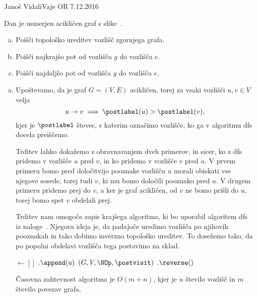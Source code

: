 \begin{naloga}{Janoš Vidali}{Vaje OR 7.12.2016}
\begin{vprasanje}
Dan je usmerjen acikličen graf s slike~\fig.

\begin{enumerate}[(a)]
\item Poišči topološko ureditev vozlišč zgornjega grafa.

\item Poišči najkrajšo pot od vozlišča $g$ do vozlišča $e$.

\item Poišči najdaljšo pot od vozlišča $g$ do vozlišča $e$.
\end{enumerate}

\begin{slika}
\pgfslika
{}
\end{slika}
\end{vprasanje}

\begin{odgovor}
\begin{enumerate}[(a)]
\item Upoštevamo, da je graf $G = (V, E)$ acikličen,
torej za vsaki vozlišči $u, v \in V$ velja
$$
u \rightarrow v \implies \postlabel(u) > \postlabel(v),
$$
kjer je $\postlabel$ števec, s katerim označimo vozlišče,
ko ga v algoritmu {\sc dfs} docela preiščemo.

Trditev lahko dokažemo z obravnavanjem dveh primerov, in sicer, 
ko z {\sc dfs} pridemo v vozlišče $u$ pred $v$,
in ko pridemo v vozlišče $v$ pred $u$.
V prvem primeru bomo pred določitvijo pooznake vozlišču $u$
morali obiskati vse njegove sosede,
torej tudi $v$, ki mu bomo določili pooznako pred $u$.
V drugem primeru pridemo prej do $v$,
a ker je graf acikličen, od $v$ ne bomo prišli do $u$,
torej bomo spet $v$ obdelali prej.

Trditev nam omogoča zapis krajšega algoritma,
ki bo uporabil algoritem {\sc dfs} iz naloge~\nal[dfs].
Njegova ideja je, da padajoče uredimo vozlišča po njihovih pooznakah
in tako dobimo inverzno topološko ureditev.
To dosežemo tako, da po popolni obdelavi vozlišča tega postavimo na sklad.
\begin{small}
\begin{algorithmic}
	 $\gets []$
		$.\append(u)$
	\EndFunction
	$(G, V, \NOp, \postvisit)$
	$.\reverse()$
	\State {}
\EndFunction
\end{algorithmic}
\end{small}
Časovna zahtevnost algoritma je $O(m + n)$,
kjer je $n$ število vozlišč in $m$ število povezav grafa.


\end{enumerate}
\end{odgovor}
\end{naloga}
